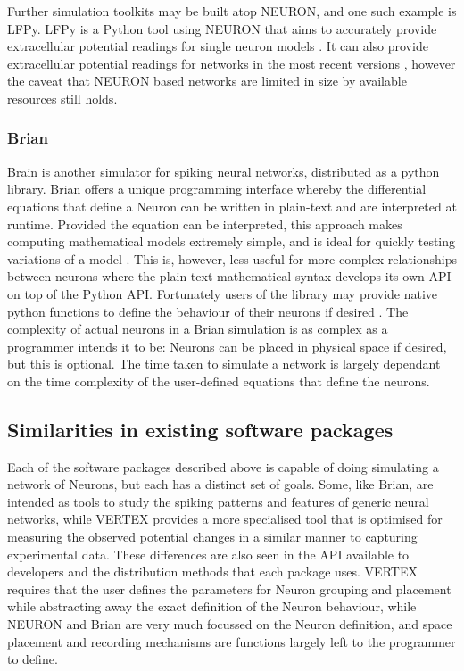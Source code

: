 Further simulation toolkits may be built atop NEURON, and one such example is
LFPy. LFPy is a Python tool using NEURON that aims to accurately provide
extracellular potential readings for single neuron models
\autocite{hagen_hybrid_2016}. It can also provide extracellular potential
readings for networks in the most recent versions \autocite{hagen_lfpy_2019},
however the caveat that NEURON based networks are limited in size by available
resources still holds.

\subsubsection{Brian}

Brain is another simulator for spiking neural networks, distributed as a python
library. Brian offers a unique programming interface whereby the differential
equations that define a Neuron can be written in plain-text and are interpreted
at runtime. Provided the equation can be interpreted, this approach
makes computing mathematical models extremely simple, and is ideal for
quickly testing variations of a model \autocite{stimberg_brian_2019}. This is,
however, less useful for more complex relationships between neurons where the
plain-text mathematical syntax develops its own API on top of the Python API.
Fortunately users of the library may provide native python functions to define
the behaviour of their neurons if desired \autocite{noauthor_functions_2020}.
The complexity of actual neurons in a Brian simulation is as complex as a
programmer intends it to be: Neurons can be placed in physical space if desired,
but this is optional. The time taken to simulate a network is largely dependant
on the time complexity of the user-defined equations that define the neurons.

\subsection{Similarities in existing software packages}

Each of the software packages described above is capable of doing simulating a
network of Neurons, but each has a distinct set of goals. Some, like Brian, are
intended as tools to study the spiking patterns and features of generic neural
networks, while VERTEX provides a more specialised tool that is optimised for
measuring the observed potential changes in a similar manner to capturing
experimental data. These differences are also seen in the API available to
developers
and the distribution methods that each package uses. VERTEX requires that the
user defines the parameters for Neuron grouping and placement while abstracting
away the exact definition of the Neuron behaviour, while NEURON and Brian are
very much focussed on the Neuron definition, and space placement and recording
mechanisms are functions largely left to the programmer to define.